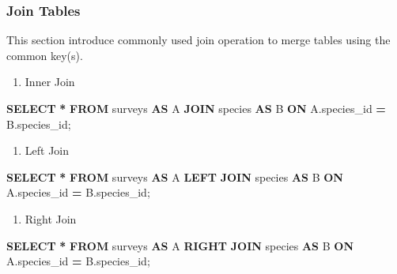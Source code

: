 \documentclass[
]{book}
\newenvironment{Shaded}{\begin{snugshade}}{\end{snugshade}}
\newcommand{\KeywordTok}[1]{\textcolor[rgb]{0.13,0.29,0.53}{\textbf{#1}}}
\newcommand{\NormalTok}[1]{#1}
\newcommand{\OperatorTok}[1]{\textcolor[rgb]{0.81,0.36,0.00}{\textbf{#1}}}
\providecommand{\tightlist}{%
  \setlength{\itemsep}{0pt}\setlength{\parskip}{0pt}}
\begin{document}
\hypertarget{join-tables}{%
\subsubsection{Join Tables}\label{join-tables}}

This section introduce commonly used join operation to merge tables using the common key(s).

\begin{enumerate}
\def\labelenumi{\arabic{enumi}.}
\tightlist
\item
  Inner Join
\end{enumerate}

\begin{Shaded}
\begin{Highlighting}[]
\KeywordTok{SELECT} \OperatorTok{*}
\KeywordTok{FROM}\NormalTok{ surveys }\KeywordTok{AS}\NormalTok{ A}
\KeywordTok{JOIN}\NormalTok{ species }\KeywordTok{AS}\NormalTok{ B}
\KeywordTok{ON}\NormalTok{ A.species\_id }\OperatorTok{=}\NormalTok{ B.species\_id;}
\end{Highlighting}
\end{Shaded}

\begin{enumerate}
\def\labelenumi{\arabic{enumi}.}
\setcounter{enumi}{1}
\tightlist
\item
  Left Join
\end{enumerate}

\begin{Shaded}
\begin{Highlighting}[]
\KeywordTok{SELECT} \OperatorTok{*}
\KeywordTok{FROM}\NormalTok{ surveys }\KeywordTok{AS}\NormalTok{ A}
\KeywordTok{LEFT} \KeywordTok{JOIN}\NormalTok{ species }\KeywordTok{AS}\NormalTok{ B}
\KeywordTok{ON}\NormalTok{ A.species\_id }\OperatorTok{=}\NormalTok{ B.species\_id;}
\end{Highlighting}
\end{Shaded}

\begin{enumerate}
\def\labelenumi{\arabic{enumi}.}
\setcounter{enumi}{2}
\tightlist
\item
  Right Join
\end{enumerate}

\begin{Shaded}
\begin{Highlighting}[]
\KeywordTok{SELECT} \OperatorTok{*}
\KeywordTok{FROM}\NormalTok{ surveys }\KeywordTok{AS}\NormalTok{ A}
\KeywordTok{RIGHT} \KeywordTok{JOIN}\NormalTok{ species }\KeywordTok{AS}\NormalTok{ B}
\KeywordTok{ON}\NormalTok{ A.species\_id }\OperatorTok{=}\NormalTok{ B.species\_id;}
\end{Highlighting}
\end{Shaded}
\end{document}
